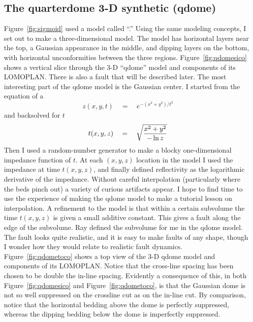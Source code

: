 \subsection{The quarterdome  3-D synthetic (qdome)}
Figure~\ref{fig:sigmoid}
used a model called ``.''
Using the same modeling concepts,
I set out to make a three-dimensional model.
The model has horizontal layers near the top,
a Gaussian appearance in the middle, and dipping layers on the bottom,
with horizontal unconformities between the three regions.
Figure~\ref{fig:qdomesico} shows
a vertical slice through the 3-D ``qdome'' model
and components of its LOMOPLAN.
There is also a fault that will be described later.
The most interesting part of the qdome model is the Gaussian center.
I started from the equation of a 
\begin{equation}
z(x,y,t) \quad = \quad e^{-(x^2+y^2)/ t^2}
\end{equation}
and backsolved for $t$
\begin{equation}
t(x,y,z) \quad = \quad \sqrt{x^2+y^2 \over -\ln z}
\end{equation}
Then I used a random-number generator
to make a blocky one-dimensional impedance function of $t$.
At each $(x,y,z)$ location in the model
I used the impedance at time $t(x,y,z)$,
and finally defined reflectivity as the logarithmic derivative
of the impedance.
Without careful interpolation (particularly where the beds pinch out)
a variety of curious artifacts appear.
I hope to find time to
use the experience of making the qdome model
to make a tutorial lesson on interpolation.
A refinement to the model is that within a certain subvolume
the time $t(x,y,z)$ is given a small additive constant.
This gives a fault along the edge of the subvolume.
Ray  defined the subvolume for me in the qdome model.
The fault looks quite realistic,
and it is easy to make faults of any shape,
though I wonder how they would relate to realistic fault dynamics.
Figure~\ref{fig:qdometoco} shows
        a top view of
        the 3-D qdome model
        and components of its LOMOPLAN.
\noindent
Notice that the cross-line spacing
has been chosen to be double the in-line spacing.
Evidently a consequence of this,
in both
Figure~\ref{fig:qdomesico} and
Figure~\ref{fig:qdometoco}, is that the Gaussian dome is not so well suppressed
on the crossline cut as on the in-line cut.
By comparison, notice that the horizontal bedding above the dome
is perfectly suppressed,
whereas the dipping bedding below the dome is imperfectly suppressed.

